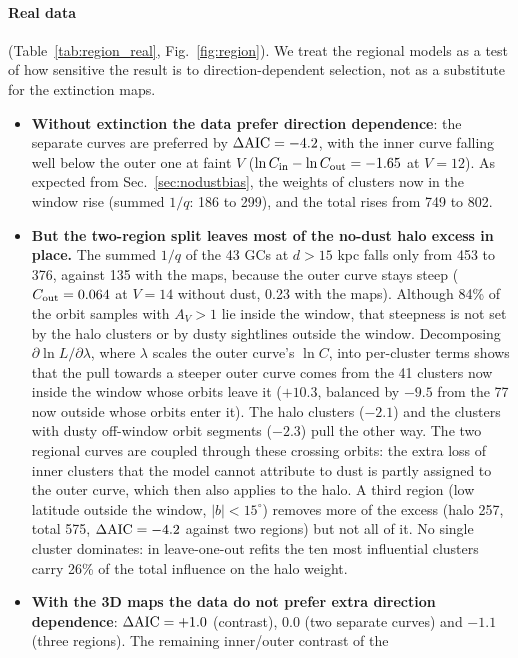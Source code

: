 \documentclass[11pt,a4paper]{article}
\newcommand{\dhel}{d}
\begin{document}
\paragraph{Real data} (Table~\ref{tab:region_real}, Fig.~\ref{fig:region}). We treat the regional
models as a test of how sensitive the result is to direction-dependent selection, not as a substitute
for the extinction maps.
\begin{itemize}
\item \textbf{Without extinction the data prefer direction dependence}: the separate curves are
preferred by $\Delta{\rm AIC}=-4.2$, with the inner curve falling well below the outer one at faint $V$
($\ln C_{\rm in}-\ln C_{\rm out}=-1.65$ at $V=12$). As expected from Sec.~\ref{sec:nodustbias}, the weights
of clusters now in the window rise (summed $1/q$: 186 to 299), and the total rises from 749 to 802.
\item \textbf{But the two-region split leaves most of the no-dust halo excess in place.} The summed $1/q$
of the 43 GCs at $\dhel>15$ kpc falls only from 453 to 376, against 135 with the maps, because the outer
curve stays steep ($C_{\rm out}=0.064$ at $V=14$ without dust, 0.23 with the maps). Although 84\% of
the orbit samples with $A_V>1$ lie inside the window, that steepness is not set by the halo clusters or by
dusty sightlines outside the window. Decomposing $\partial\ln L/\partial\lambda$, where $\lambda$ scales
the outer curve's $\ln C$, into per-cluster terms shows that the pull towards a steeper outer curve
comes from the 41 clusters now inside the window whose orbits leave it ($+10.3$, balanced by $-9.5$ from
the 77 now outside whose orbits enter it). The halo clusters ($-2.1$) and the clusters with dusty
off-window orbit segments ($-2.3$) pull the other way. The two regional curves are coupled through these
crossing orbits: the extra loss of inner clusters that the model cannot attribute to dust is partly
assigned to the outer curve, which then also applies to the halo. A third region (low latitude outside
the window, $|b|<15^\circ$) removes more of the excess (halo 257, total 575, $\Delta{\rm AIC}=-4.2$ against
two regions) but not all of it. No single cluster dominates: in leave-one-out refits the ten most
influential clusters carry 26\% of the total influence on the halo weight.
\item \textbf{With the 3D maps the data do not prefer extra direction dependence}: $\Delta{\rm AIC}=+1.0$
(contrast), $0.0$ (two separate curves) and $-1.1$ (three regions). The remaining inner/outer contrast of the

\end{itemize}
\end{document}
